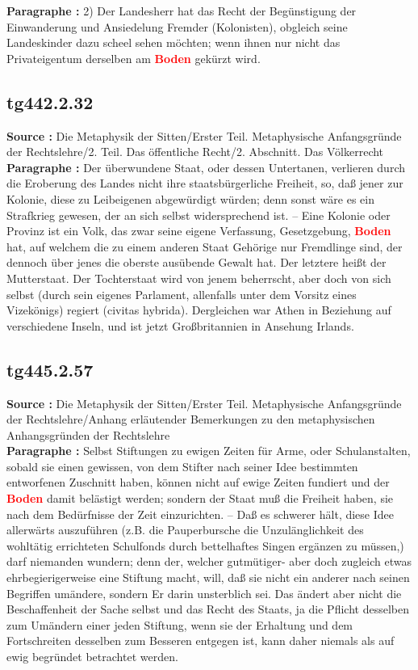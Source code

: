 \documentclass[a4paper,12pt,twoside]{book}
\newcommand{\match}[1]{\textcolor{red}{\textbf{#1}}}
\begin{document}
	\textbf{Paragraphe : }
	2) Der Landesherr hat das Recht der Begünstigung der Einwanderung und Ansiedelung Fremder (Kolonisten), obgleich seine Landeskinder dazu scheel sehen möchten; wenn ihnen nur nicht das Privateigentum derselben am \match{Boden} gekürzt wird. 
	
	\subsection*{tg442.2.32} 
	\textbf{Source : }Die Metaphysik der Sitten/Erster Teil. Metaphysische Anfangsgründe der Rechtslehre/2. Teil. Das öffentliche Recht/2. Abschnitt. Das Völkerrecht\\  
	
	\textbf{Paragraphe : }Der überwundene Staat, oder dessen Untertanen, verlieren durch die Eroberung des Landes nicht ihre staatsbürgerliche Freiheit, so, daß jener zur Kolonie, diese zu Leibeigenen abgewürdigt würden; denn sonst wäre es ein Strafkrieg gewesen, der an sich selbst widersprechend ist. – Eine Kolonie oder Provinz ist ein Volk, das zwar seine eigene Verfassung, Gesetzgebung, \match{Boden} hat, auf welchem die zu einem anderen Staat Gehörige nur Fremdlinge sind, der dennoch über jenes die oberste ausübende Gewalt hat. Der letztere heißt der Mutterstaat. Der Tochterstaat wird von jenem beherrscht, aber doch von sich selbst (durch sein eigenes Parlament, allenfalls unter dem Vorsitz eines Vizekönigs) regiert (civitas hybrida). Dergleichen war Athen in Beziehung auf verschiedene Inseln, und ist jetzt Großbritannien in Ansehung Irlands. 
	
	\subsection*{tg445.2.57} 
	\textbf{Source : }Die Metaphysik der Sitten/Erster Teil. Metaphysische Anfangsgründe der Rechtslehre/Anhang erläutender Bemerkungen zu den metaphysischen Anhangsgründen der Rechtslehre\\  
	
	\textbf{Paragraphe : }Selbst Stiftungen zu ewigen Zeiten für Arme, oder Schulanstalten, sobald sie einen gewissen, von dem Stifter nach  seiner Idee bestimmten entworfenen Zuschnitt haben, können nicht auf ewige Zeiten fundiert und der \match{Boden} damit belästigt werden; sondern der Staat muß die Freiheit haben, sie nach dem Bedürfnisse der Zeit einzurichten. – Daß es schwerer hält, diese Idee allerwärts auszuführen (z.B. die Pauperbursche die Unzulänglichkeit des wohltätig errichteten Schulfonds durch bettelhaftes Singen ergänzen zu müssen,) darf niemanden wundern; denn der, welcher gutmütiger- aber doch zugleich etwas ehrbegierigerweise eine Stiftung macht, will, daß sie nicht ein anderer nach seinen Begriffen umändere, sondern Er darin unsterblich sei. Das ändert aber nicht die Beschaffenheit der Sache selbst und das Recht des Staats, ja die Pflicht desselben zum Umändern einer jeden Stiftung, wenn sie der Erhaltung und dem Fortschreiten desselben zum Besseren entgegen ist, kann daher niemals als auf ewig begründet betrachtet werden. 
	
\end{document}
